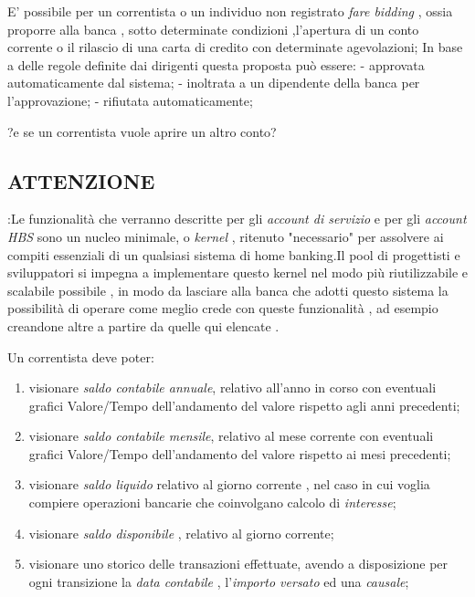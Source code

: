 {{{{{{{{{{{{{{{{{{{{{{{{{{{{{{{{{{{{{{{{{{{{{{{{{{{{{{{{{{{{{{{{{{{{{{{{{{{{{{{{{{{{{{{{{{{{{{{{{{{{{{{{{{{{{{{{{	
E' possibile per un correntista o un individuo non registrato \emph{fare bidding} , ossia proporre alla banca , sotto determinate condizioni ,l'apertura di un conto corrente o il rilascio di una carta di credito con determinate agevolazioni;
	In base a delle regole definite dai dirigenti questa proposta pu\`o essere:
- approvata automaticamente dal sistema;
- inoltrata a un dipendente della banca per l'approvazione;
- rifiutata automaticamente;
}}}}}}}}}}}}}}}}}}}}}}}}}}}}}}}}}}}}}}}}}}}}}}}}}}}}}}}}}}}}}}}}}}}}}}}}}}}}}}}}}}}}}}}}}}}}}}}}}}}}}}}}}}}}}
	
?e se un correntista vuole aprire un altro conto?

\subsection{ ATTENZIONE }:Le funzionalità che verranno descritte per gli \emph{account di servizio} e per gli \emph{account HBS} sono un  nucleo minimale, o \emph{kernel} , ritenuto "necessario" per assolvere ai compiti essenziali di un qualsiasi sistema di home banking.Il pool di progettisti e sviluppatori si impegna a implementare questo kernel nel modo più riutilizzabile e scalabile possibile , in modo da lasciare alla banca che adotti questo sistema la possibilità di operare come meglio crede con queste funzionalità , ad esempio creandone altre a partire da quelle qui elencate .




Un correntista deve poter:
	\begin{enumerate} 
	\item visionare \emph{saldo contabile annuale}, relativo all'anno in corso con eventuali grafici Valore/Tempo dell'andamento del valore rispetto agli anni precedenti;
	\item visionare \emph{saldo contabile mensile}, relativo al mese corrente con eventuali grafici Valore/Tempo dell'andamento del valore rispetto ai mesi precedenti;
	\item visionare \emph{saldo liquido} relativo al giorno corrente , nel caso in cui voglia compiere operazioni bancarie che coinvolgano calcolo di \emph{interesse};
	\item visionare \emph{saldo disponibile} , relativo al giorno corrente;
	\item visionare uno storico delle transazioni effettuate, avendo a disposizione per ogni transizione la \emph{data contabile} , l'\emph{importo versato} ed una \emph{causale};
	

\end{enumerate}}}}}
